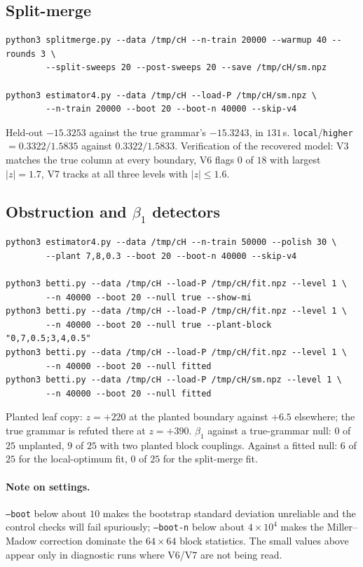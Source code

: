 \subsection*{Split-merge}

\begin{verbatim}
python3 splitmerge.py --data /tmp/cH --n-train 20000 --warmup 40 --rounds 3 \
        --split-sweeps 20 --post-sweeps 20 --save /tmp/cH/sm.npz

python3 estimator4.py --data /tmp/cH --load-P /tmp/cH/sm.npz \
        --n-train 20000 --boot 20 --boot-n 40000 --skip-v4
\end{verbatim}
Held-out $-15.3253$ against the true grammar's $-15.3243$, in $131$\,s.
\texttt{local}/\texttt{higher} $=0.3322/1.5835$ against $0.3322/1.5833$.
Verification of the recovered model: V3 matches the true column at every
boundary, V6 flags $0$ of $18$ with largest $|z|=1.7$, V7 tracks at all three
levels with $|z|\le1.6$.

\subsection*{Obstruction and $\beta_1$ detectors}

\begin{verbatim}
python3 estimator4.py --data /tmp/cH --n-train 50000 --polish 30 \
        --plant 7,8,0.3 --boot 20 --boot-n 40000 --skip-v4

python3 betti.py --data /tmp/cH --load-P /tmp/cH/fit.npz --level 1 \
        --n 40000 --boot 20 --null true --show-mi
python3 betti.py --data /tmp/cH --load-P /tmp/cH/fit.npz --level 1 \
        --n 40000 --boot 20 --null true --plant-block "0,7,0.5;3,4,0.5"
python3 betti.py --data /tmp/cH --load-P /tmp/cH/fit.npz --level 1 \
        --n 40000 --boot 20 --null fitted
python3 betti.py --data /tmp/cH --load-P /tmp/cH/sm.npz --level 1 \
        --n 40000 --boot 20 --null fitted
\end{verbatim}
Planted leaf copy: $z=+220$ at the planted boundary against $+6.5$ elsewhere;
the true grammar is refuted there at $z=+390$. $\beta_1$ against a true-grammar
null: $0$ of $25$ unplanted, $9$ of $25$ with two planted block couplings.
Against a fitted null: $6$ of $25$ for the local-optimum fit, $0$ of $25$ for
the split-merge fit.

\paragraph{Note on settings.} \texttt{--boot} below about $10$ makes the
bootstrap standard deviation unreliable and the control checks will fail
spuriously; \texttt{--boot-n} below about $4\times10^4$ makes the Miller--Madow
correction dominate the $64\times64$ block statistics. The small values above
appear only in diagnostic runs where V6/V7 are not being read.


